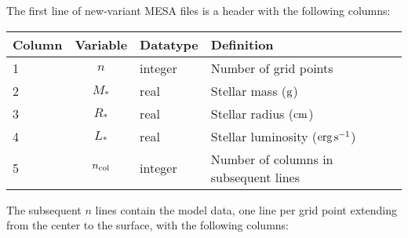 \documentclass{article}
\newcommand{\Rstar}{\ensuremath{R_{\ast}}}
\newcommand{\Mstar}{\ensuremath{M_{\ast}}}
\newcommand{\Lstar}{\ensuremath{L_{\ast}}}
\newcommand{\cm}{\ensuremath{{\rm cm}}}
\newcommand{\gram}{\ensuremath{{\rm g}}}
\newcommand{\second}{\ensuremath{{\rm s}}}
\newcommand{\erg}{\ensuremath{{\rm erg}}}
\begin{document}
The first line of new-variant MESA files is a header with the following
columns:

\begin{table}[h!]
\begin{tabular}{|l|c|l|l|} \hline
Column & Variable & Datatype & Definition \\ \hline
1      & $n$ & integer & Number of grid points \\
2      & \Mstar & real & Stellar mass ($\gram$) \\
3      & \Rstar & real & Stellar radius ($\cm$) \\
4      & \Lstar & real & Stellar luminosity ($\erg\,\second^{-1}$) \\
5      & $n_{\rm col}$ & integer & Number of columns in subsequent lines \\ \hline
\end{tabular}
\end{table}

The subsequent $n$ lines contain the model data, one line per
grid point extending from the center to the surface, with the following columns:
\end{document}
